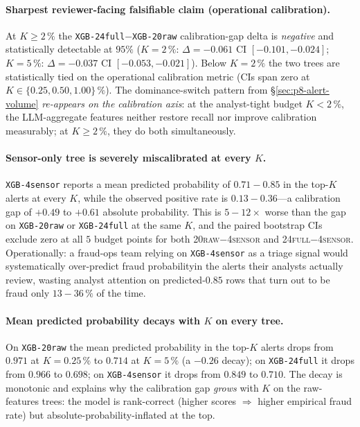 \paragraph{Sharpest reviewer-facing falsifiable claim (operational calibration).}
At $K \ge 2\,\%$ the \texttt{XGB-24full}${-}$\texttt{XGB-20raw}
calibration-gap delta is \emph{negative} and statistically detectable at
$95\%$ ($K{=}2\,\%$: $\Delta = -0.061$ CI $[-0.101, -0.024]$;
$K{=}5\,\%$: $\Delta = -0.037$ CI $[-0.053, -0.021]$). Below
$K{=}2\,\%$ the two trees are statistically tied on the operational
calibration metric (CIs span zero at $K \in \{0.25, 0.50, 1.00\}\,\%$).
The dominance-switch pattern from \S\ref{sec:p8-alert-volume}
\emph{re-appears on the calibration axis}: at the analyst-tight budget
$K < 2\,\%$, the LLM-aggregate features neither restore recall nor
improve calibration measurably; at $K \ge 2\,\%$, they do both
simultaneously.

\paragraph{Sensor-only tree is severely miscalibrated at every $K$.}
\texttt{XGB-4sensor} reports a mean predicted probability of
$0.71{-}0.85$ in the top-$K$ alerts at every $K$, while the observed
positive rate is $0.13{-}0.36$---a calibration gap of $+0.49$ to
$+0.61$ absolute probability. This is $5{-}12\times$ worse than the
gap on \texttt{XGB-20raw} or \texttt{XGB-24full} at the same $K$, and
the paired bootstrap CIs exclude zero at all $5$ budget points for both
\textsc{20raw}${-}$\textsc{4sensor} and \textsc{24full}${-}$\textsc{4sensor}.
Operationally: a fraud-ops team relying on \texttt{XGB-4sensor} as a
triage signal would systematically over-predict fraud probabilityin the
alerts their analysts actually review, wasting analyst attention on
predicted-$0.85$ rows that turn out to be fraud only $13{-}36\,\%$ of
the time.

\paragraph{Mean predicted probability decays with $K$ on every tree.}
On \texttt{XGB-20raw} the mean predicted probability in the top-$K$
alerts drops from $0.971$ at $K{=}0.25\,\%$ to $0.714$ at
$K{=}5\,\%$ (a $-0.26$ decay); on \texttt{XGB-24full} it drops from
$0.966$ to $0.698$; on \texttt{XGB-4sensor} it drops from $0.849$ to
$0.710$. The decay is monotonic and explains why the calibration gap
\emph{grows} with $K$ on the raw-features trees: the model is
rank-correct (higher scores $\Rightarrow$ higher empirical fraud rate)
but absolute-probability-inflated at the top.

